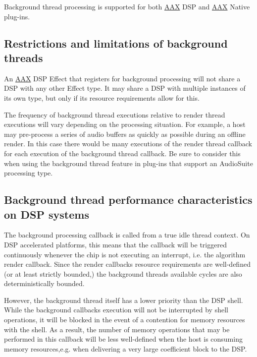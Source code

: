 Background thread processing is supported for both \hyperlink{a00288}{A\+A\+X} D\+S\+P and \hyperlink{a00288}{A\+A\+X} Native plug-\/ins.\hypertarget{a00341_alg_bg_restrict}{}\subsection{Restrictions and limitations of background threads}\label{a00341_alg_bg_restrict}
\begin{DoxyItemize}
\item An \hyperlink{a00288}{A\+A\+X} D\+S\+P Effect that registers for background processing will not share a D\+S\+P with any other Effect type. It may share a D\+S\+P with multiple instances of its own type, but only if its resource requirements allow for this. \item The frequency of background thread executions relative to render thread executions will vary depending on the processing situation. For example, a host may pre-\/process a series of audio buffers as quickly as possible during an offline render. In this case there would be many executions of the render thread callback for each execution of the background thread callback. Be sure to consider this when using the background thread feature in plug-\/ins that support an Audio\+Suite processing type.\end{DoxyItemize}
\hypertarget{a00341_alg_bg_perf}{}\subsection{Background thread performance characteristics on D\+S\+P systems}\label{a00341_alg_bg_perf}
The background processing callback is called from a true idle thread context. On D\+S\+P accelerated platforms, this means that the callback will be triggered continuously whenever the chip is not executing an interrupt, i.\+e. the algorithm render callback. Since the render callback\textquotesingle{}s resource requirements are well-\/defined (or at least strictly bounded,) the background thread\textquotesingle{}s available cycles are also deterministically bounded.

However, the background thread itself has a lower priority than the D\+S\+P shell. While the background callback\textquotesingle{}s execution will not be interrupted by shell operations, it will be blocked in the event of a contention for memory resources with the shell. As a result, the number of memory operations that may be performed in this callback will be less well-\/defined when the host is consuming memory resources,e.\+g. when delivering a very large coefficient block to the D\+S\+P.

